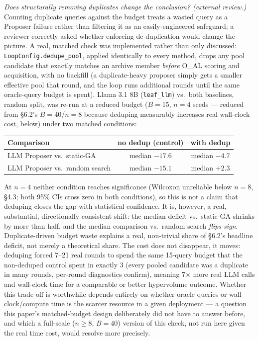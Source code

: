 \documentclass{article}
\begin{document}
\emph{Does structurally removing duplicates change the conclusion?
(external review.)} Counting duplicate queries against the budget treats
a wasted query as a Proposer failure rather than filtering it as an
easily-engineered safeguard; a reviewer correctly asked whether enforcing
de-duplication would change the picture. A real, matched check was
implemented rather than only discussed: \texttt{LoopConfig.dedupe\_pool},
applied identically to every method, drops any pool candidate that
exactly matches an archive member \emph{before} O\_AL scoring and
acquisition, with no backfill (a duplicate-heavy proposer simply gets a
smaller effective pool that round, and the loop runs additional rounds
until the same oracle-query budget is spent). Llama 3.1 8B (\texttt{leaf\_llm})
vs.\ both baselines, random split, was re-run at a reduced budget ($B=15$,
$n=4$ seeds --- reduced from \S6.2's $B=40$/$n=8$ because deduping
measurably increases real wall-clock cost, below) under two matched
conditions:

\begin{center}
\begin{tabular}{lcc}
\toprule
Comparison & no dedup (control) & with dedup \\
\midrule
LLM Proposer vs.\ static-GA & median $-17.6$ & median $-4.7$ \\
LLM Proposer vs.\ random search & median $-15.1$ & median $+2.3$ \\
\bottomrule
\end{tabular}
\end{center}

At $n=4$ neither condition reaches significance (Wilcoxon unreliable
below $n=8$, \S4.3; both 95\% CIs cross zero in both conditions), so this
is not a claim that deduping closes the gap with statistical confidence.
It is, however, a real, substantial, directionally consistent shift: the
median deficit vs.\ static-GA shrinks by more than half, and the median
comparison vs.\ random search \emph{flips sign}. Duplicate-driven budget
waste explains a real, non-trivial share of \S6.2's headline deficit, not
merely a theoretical share. The cost does not disappear, it moves:
deduping forced 7--21 real rounds to spend the same 15-query budget that
the non-deduped control spent in exactly 3 (every pooled candidate was a
duplicate in many rounds, per-round diagnostics confirm), meaning
7$\times$ more real LLM calls and wall-clock time for a comparable or
better hypervolume outcome. Whether this trade-off is worthwhile depends
entirely on whether oracle queries or wall-clock/compute time is the
scarcer resource in a given deployment --- a question this paper's
matched-budget design deliberately did not have to answer before, and
which a full-scale ($n\ge8$, $B=40$) version of this check, not run here
given the real time cost, would resolve more precisely.
\end{document}
